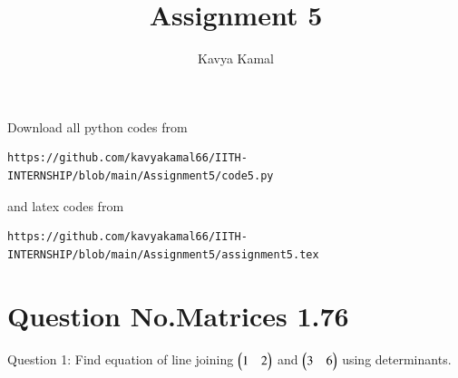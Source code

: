 \documentclass[journal,12pt,twocolumn]{IEEEtran}
\begin{document}
     \def\centbox#1{\makebox[0in]{#1}}
     \def\topbox#1{\raisebox{-\baselineskip}[0in][0in]{#1}}
     \def\midbox#1{\raisebox{-0.5\baselineskip}[0in][0in]{#1}}
\vspace{3cm}
\title{Assignment 5}
\author{Kavya Kamal}
\maketitle
\newpage
\bigskip
\renewcommand{\thefigure}{\theenumi}
\renewcommand{\thetable}{\theenumi}
Download all python codes from 
\begin{lstlisting}
https://github.com/kavyakamal66/IITH-INTERNSHIP/blob/main/Assignment5/code5.py
\end{lstlisting}
%
and latex codes from 
%
\begin{lstlisting}
https://github.com/kavyakamal66/IITH-INTERNSHIP/blob/main/Assignment5/assignment5.tex
\end{lstlisting}
%
\section{Question No.Matrices 1.76}
Question 1:
Find equation of line joining $\begin{pmatrix}1 & 2\end{pmatrix}$ and
$\begin{pmatrix}3 & 6\end{pmatrix}$ using determinants.
\end{document}
